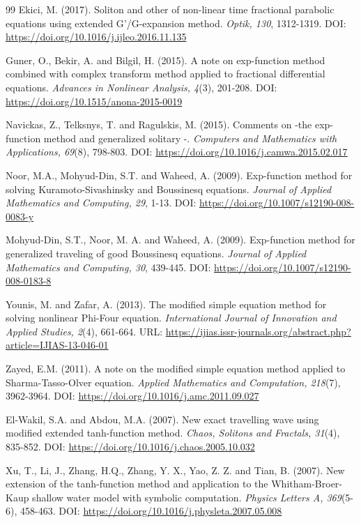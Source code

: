 \documentclass[10pt]{NSP1}
\numberwithin{equation}{section}
\begin{document}
\begin{thebibliography}{99}
 Ekici, M. (2017). Soliton and other  of non-linear time fractional parabolic equations using extended G'/G-expansion method. \emph{Optik, 130}, 1312-1319. DOI: \url{https://doi.org/10.1016/j.ijleo.2016.11.135}

 Guner, O., Bekir, A. and Bilgil, H. (2015). A note on exp-function method combined with complex transform method applied to fractional differential equations. \emph{Advances in Nonlinear Analysis, 4}(3), 201-208. DOI: \url{https://doi.org/10.1515/anona-2015-0019}

 Navickas, Z., Telksnys, T. and Ragulskis, M. (2015). Comments on -the exp-function method and generalized solitary -. \emph{Computers and Mathematics with Applications, 69}(8), 798-803. DOI: \url{https://doi.org/10.1016/j.camwa.2015.02.017}

 Noor, M.A., Mohyud-Din, S.T. and Waheed, A. (2009). Exp-function method for solving Kuramoto-Sivashinsky and Boussinesq equations. \emph{Journal of Applied Mathematics and Computing, 29}, 1-13. DOI: \url{https://doi.org/10.1007/s12190-008-0083-y}

 Mohyud-Din, S.T., Noor, M. A. and Waheed, A. (2009). Exp-function method for generalized traveling  of good Boussinesq equations. \emph{Journal of Applied Mathematics and Computing, 30}, 439-445. DOI: \url{https://doi.org/10.1007/s12190-008-0183-8}

 Younis, M. and Zafar, A. (2013). The modified simple equation method for solving nonlinear Phi-Four equation. \emph{International Journal of Innovation and Applied Studies, 2}(4), 661-664. URL: \url{https://ijias.issr-journals.org/abstract.php?article=IJIAS-13-046-01}

 Zayed, E.M. (2011). A note on the modified simple equation method applied to Sharma-Tasso-Olver equation. \emph{Applied Mathematics and Computation, 218}(7), 3962-3964. DOI: \url{https://doi.org/10.1016/j.amc.2011.09.027}

 El-Wakil, S.A. and Abdou, M.A. (2007). New exact travelling wave  using modified extended tanh-function method. \emph{Chaos, Solitons and Fractals, 31}(4), 835-852. DOI: \url{https://doi.org/10.1016/j.chaos.2005.10.032}

 Xu, T., Li, J., Zhang, H.Q., Zhang, Y. X., Yao, Z. Z. and Tian, B. (2007). New extension of the tanh-function method and application to the Whitham-Broer-Kaup shallow water model with symbolic computation. \emph{Physics Letters A, 369}(5-6), 458-463. DOI: \url{https://doi.org/10.1016/j.physleta.2007.05.008}


\end{thebibliography}
\end{document}
